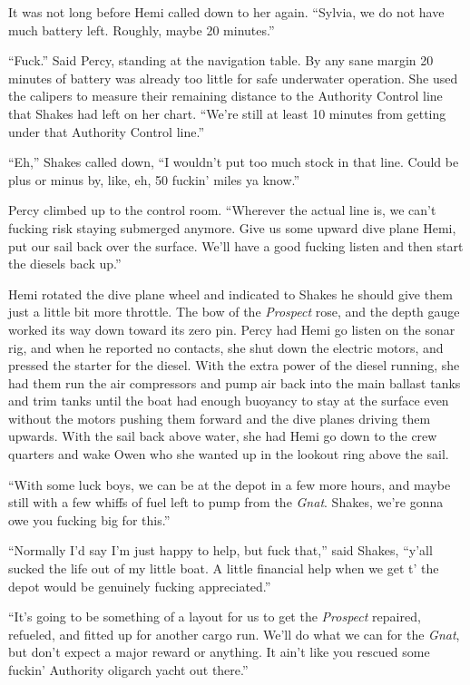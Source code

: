 \documentclass[]{scrbook}
\begin{document}
It was not long before Hemi called down to her again. ``Sylvia, we do
not have much battery left. Roughly, maybe 20 minutes.''

``Fuck.'' Said Percy, standing at the navigation table. By any sane
margin 20 minutes of battery was already too little for safe underwater
operation. She used the calipers to measure their remaining distance to
the Authority Control line that Shakes had left on her chart. ``We're
still at least 10 minutes from getting under that Authority Control
line.''

``Eh,'' Shakes called down, ``I wouldn't put too much stock in that
line. Could be plus or minus by, like, eh, 50 fuckin' miles ya know.''

Percy climbed up to the control room. ``Wherever the actual line is, we
can't fucking risk staying submerged anymore. Give us some upward dive
plane Hemi, put our sail back over the surface. We'll have a good
fucking listen and then start the diesels back up.''

Hemi rotated the dive plane wheel and indicated to Shakes he should give
them just a little bit more throttle. The bow of the \emph{Prospect}
rose, and the depth gauge worked its way down toward its zero pin. Percy
had Hemi go listen on the sonar rig, and when he reported no contacts,
she shut down the electric motors, and pressed the starter for the
diesel. With the extra power of the diesel running, she had them run the
air compressors and pump air back into the main ballast tanks and trim
tanks until the boat had enough buoyancy to stay at the surface even
without the motors pushing them forward and the dive planes driving them
upwards. With the sail back above water, she had Hemi go down to the
crew quarters and wake Owen who she wanted up in the lookout ring above
the sail.

``With some luck boys, we can be at the depot in a few more hours, and
maybe still with a few whiffs of fuel left to pump from the \emph{Gnat}.
Shakes, we're gonna owe you fucking big for this.''

``Normally I'd say I'm just happy to help, but fuck that,'' said Shakes,
``y'all sucked the life out of my little boat. A little financial help
when we get t' the depot would be genuinely fucking appreciated.''

``It's going to be something of a layout for us to get the
\emph{Prospect} repaired, refueled, and fitted up for another cargo run.
We'll do what we can for the \emph{Gnat}, but don't expect a major
reward or anything. It ain't like you rescued some fuckin' Authority
oligarch yacht out there.''
\end{document}
